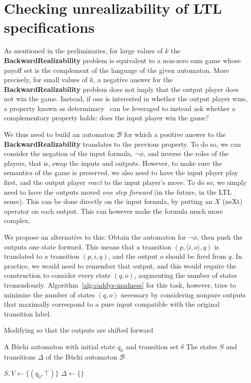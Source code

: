 \documentclass[runningheads,a4paper]{llncs}
\begin{document}
\section{Checking unrealizability of LTL specifications}\label{sec:unreal}

As mentioned in the preliminaries, for large values of $k$ the
\textbf{BackwardRealizability} problem is equivalent to a non-zero sum game
whose payoff set is the complement of the language of the given automaton.  More
precisely, for small values of $k$, a negative answer for the
\textbf{BackwardRealizability} problem does not imply that the output player
does not win the game. Instead, if one is interested in whether the output
player wins, a property known as determinacy~\cite{borel} can be leveraged to
instead ask whether a complementary property holds: does the input player win
the game?

We thus need to build an automaton \(\mathcal{B}\) for which a positive answer to
the \textbf{BackwardRealizability} translates to the previous property.  To do
so, we can consider the negation of the input formula, \(\neg\phi\), and inverse the
roles of the players, that is, swap the inputs and outputs.  However, to make
sure the semantics of the game is preserved, we also need to have the input
player play first, and the output player \emph{react} to the input player's
move.  To do so, we simply need to have the outputs moved \emph{one step
  forward} (in the future, in the LTL sense).  This can be done directly on the
input formula, by putting an \(X\) (neXt) operator on each output.  This can
however make the formula much more complex.

We propose an alternative to this: Obtain the automaton for \(\neg \phi\), then push the
outputs one state forward. This means that a transition \((p, \langle i, o \rangle, q)\) is
translated to a transition \((p, i, q)\), and the output \(o\) should be fired from
\(q\).  In practice, we would need to remember that output, and this would require
the construction to consider every state \((q, o)\), augmenting the number of
states tremendously.  Algorithm~\ref{alg:caddys-madness} for this task, however,
tries to minimize the number of states \((q, o)\) necessary by considering nonpure
outputs that maximally correspond to a pure input compatible with the
original transition label.

  \begin{algorithm}[H]
\caption{Modifying \cA so that the outputs are shifted forward}
\label{alg:caddys-madness}
\alginput* A Büchi automaton \cA with initial state $q_0$ and transition set \(\delta\)
\algoutput* The states $S$ and transitions $\Delta$ of the B\"uchi automaton $\mathcal{B}$
\begin{algorithmic}
\State \(S,V \leftarrow \{(q_0,\top)\}\)
\State \(\Delta \leftarrow \{\}\)
\end{algorithmic}
\end{algorithm}
\end{document}
